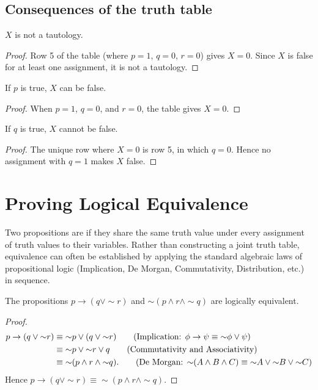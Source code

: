\subsection{Consequences of the truth table}

\begin{proposition}
$X$ is not a tautology.
\end{proposition}
\begin{proof}
Row 5 of the table (where $p = 1$, $q = 0$, $r = 0$) gives $X = 0$.
Since $X$ is false for at least one assignment, it is not a tautology.
\end{proof}

\begin{proposition}
If $p$ is true, $X$ can be false.
\end{proposition}
\begin{proof}
When $p = 1$, $q = 0$, and $r = 0$, the table gives $X = 0$.
\end{proof}

\begin{proposition}
If $q$ is true, $X$ cannot be false.
\end{proposition}
\begin{proof}
The unique row where $X = 0$ is row 5, in which $q = 0$. Hence no assignment
with $q = 1$ makes $X$ false.
\end{proof}

\section{Proving Logical Equivalence}

Two propositions are  if they share the same truth
value under every assignment of truth values to their variables. Rather than
constructing a joint truth table, equivalence can often be established by
applying the standard algebraic laws of propositional logic (Implication,
De Morgan, Commutativity, Distribution, etc.) in sequence.

\begin{proposition}
The propositions $p \to (q \lor {\sim}r)$ and ${\sim}(p \land r \land {\sim}q)$
are logically equivalent.
\end{proposition}

\begin{proof}
\begin{align*}
    p \to (q \lor {\sim}r)
    &\equiv {\sim}p \lor (q \lor {\sim}r)
    \tag{Implication: $\phi\to\psi\equiv{\sim}\phi\lor\psi$}\\
    &\equiv {\sim}p \lor {\sim}r \lor q
    \tag{Commutativity and Associativity}\\
    &\equiv {\sim}(p \land r \land {\sim}q).
    \tag{De Morgan: ${\sim}(A\land B\land C)\equiv{\sim}A\lor{\sim}B\lor{\sim}C$}
\end{align*}
Hence $p \to (q \lor {\sim}r) \equiv {\sim}(p \land r \land {\sim}q)$.
\end{proof}

